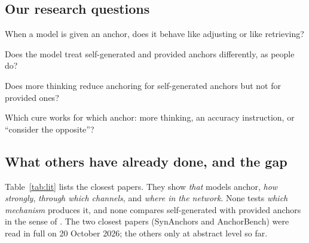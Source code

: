 \documentclass[11pt,a4paper]{article}
\begin{document}
\subsection{Our research questions}

\begin{description}[leftmargin=1.2cm,labelwidth=1cm]
  \item[RQ1] When a model is given an anchor, does it behave like adjusting or like retrieving?
  \item[RQ2] Does the model treat self-generated and provided anchors differently, as people do?
  \item[RQ3] Does more thinking reduce anchoring for self-generated anchors but not for provided ones?
  \item[RQ4] Which cure works for which anchor: more thinking, an accuracy instruction, or ``consider the opposite''?
\end{description}

\subsection{What others have already done, and the gap}

Table~\ref{tab:lit} lists the closest papers. They show \emph{that} models anchor, \emph{how strongly}, \emph{through which channels}, and \emph{where in the network}. None tests \emph{which mechanism} produces it, and none compares self-generated with provided anchors in the sense of \citet{epley2001putting}. The two closest papers (SynAnchors and AnchorBench) were read in full on 20 October 2026; the others only at abstract level so far.
\end{document}
